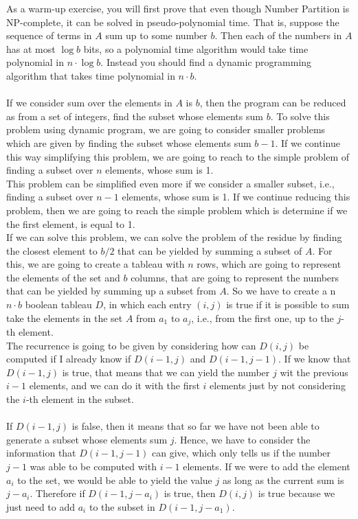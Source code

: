 \documentclass[tikz, 12pt]{scrartcl}
\begin{document}
As a warm-up exercise, you will first prove that even though Number Partition is NP-complete, it can be solved in pseudo-polynomial time. That is, suppose the sequence of terms in $A$ sum up to some number $b$. Then each of the numbers in $A$ has at most $\log b$ bits, so a polynomial time algorithm would take time polynomial in $n \cdot \log b$. Instead you should find a dynamic programming algorithm that takes time polynomial in $n \cdot b$. \\
\\
If we consider sum over the elements in $A$ is $b$, then the program can be reduced as from a set of integers, find the subset whose elements sum $b$. To solve this problem using dynamic program, we are going to consider smaller problems which are given by finding the subset whose elements sum $b - 1$. If we continue this way simplifying this problem, we are going to reach to the simple problem of finding a subset over $n$ elements, whose sum is 1. \\
This problem can be simplified even more if we consider a smaller subset, i.e., finding a subset over $n- 1$ elements, whose sum is 1. If we continue reducing this problem, then we are going to reach the simple problem which is determine if we the first element, is equal to 1. \\
If we can solve this problem, we can solve the problem of the residue by finding the closest element to $b / 2$ that can be yielded by summing a subset of $A$. For this, we are going to create a tableau with $n$ rows, which are going to represent the elements of the set and $b$ columns, that are going to represent the numbers that can be yielded by summing up a subset from $A$. So we have to create a n $n \cdot b$ boolean tableau $D$, in which each entry $(i,j)$ is true if it is possible to sum take the elements in the set $A$ from $a_1$ to $a_j$, i.e., from the first one, up to the $j$-th element.\\ 
The recurrence is going to be given by considering how can $D(i,j)$ be computed if I already know if $D(i - 1, j)$ and $D(i - 1, j- 1)$. If we know that $D(i - 1, j)$ is true, that means that we can yield the number $j$ wit the previous $i - 1$ elements, and we can do it with the first $i$ elements just by not considering the $i$-th element in the subset. \\ 
\\
If $D(i-1, j)$ is false, then it means that so far we have not been able to generate a subset whose elements sum $j$. Hence, we have to consider the information that $D(i - 1, j - 1)$ can give, which only tells us if the number $j- 1$ was able to be computed with $i -1$ elements. If we were to add the element $a_i$ to the set, we would be able to yield the value $j$ as long as the current sum is $j - a_i$. Therefore if $D(i - 1, j - a_i)$ is true, then $D(i, j)$ is true because we just need to add $a_i$ to the subset in $D(i - 1, j - a_1)$.\\
\end{document}

